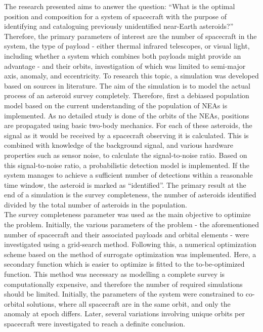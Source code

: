 The research presented aims to answer the question: ``What is the optimal position and composition for a system of spacecraft with the purpose of identifying and cataloguing previously unidentified near-Earth asteroids?'' Therefore, the primary parameters of interest are the number of spacecraft in the system, the type of payload - either thermal infrared telescopes, or visual light, including whether a system which combines both payloads might provide an advantage - and their orbits, investigation of which was limited to semi-major axis, anomaly, and eccentricity. To research this topic, a simulation was developed based on sources in literature. The aim of the simulation is to model the actual process of an asteroid survey completely. Therefore, first a debiased population model based on the current understanding of the population of NEAs is implemented. As no detailed study is done of the orbits of the NEAs, positions are propagated using basic two-body mechanics. For each of these asteroids, the signal as it would be received by a spacecraft observing it is calculated. This is combined with knowledge of the background signal, and various hardware properties such as sensor noise, to calculate the signal-to-noise ratio. Based on this signal-to-noise ratio, a probabilistic detection model is implemented. If the system manages to achieve a sufficient number of detections within a reasonable time window, the asteroid is marked as ``identified''. The primary result at the end of a simulation is the survey completeness, the number of asteroids identified divided by the total number of asteroids in the population. \\

The survey completeness parameter was used as the main objective to optimize the problem. Initially, the various parameters of the problem - the aforementioned number of spacecraft and their associated payloads and orbital elements - were investigated using a grid-search method. Following this, a numerical optimization scheme based on the method of surrogate optimization was implemented. Here, a secondary function which is easier to optimize is fitted to the to-be-optimized function. This method was necessary as modelling a complete survey is computationally expensive, and therefore the number of required simulations should be limited. Initially, the parameters of the system were constrained to co-orbital solutions, where all spacecraft are in the same orbit, and only the anomaly at epoch differs. Later, several variations involving unique orbits per spacecraft were investigated to reach a definite conclusion. \\

